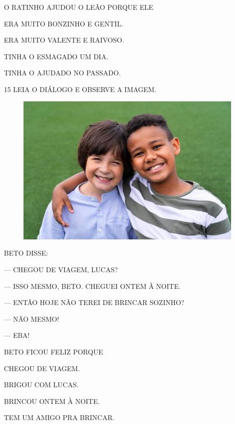 O RATINHO AJUDOU O LEÃO PORQUE ELE

\begin{escolha}
\item ERA MUITO BONZINHO E GENTIL.

\item ERA MUITO VALENTE E RAIVOSO.

\item TINHA O ESMAGADO UM DIA.

\item TINHA O AJUDADO NO PASSADO.
\end{escolha}

\pagebreak
\num{15} LEIA O DIÁLOGO E OBSERVE A IMAGEM.

\begin{figure}[H]
\centering
\includegraphics[width=\textwidth]{media/image220b.png}
\end{figure}

\begin{myquote}
BETO DISSE:

--- CHEGOU DE VIAGEM, LUCAS?

--- ISSO MESMO, BETO. CHEGUEI ONTEM À NOITE.

--- ENTÃO HOJE NÃO TEREI DE BRINCAR SOZINHO?

--- NÃO MESMO!

--- EBA!
\end{myquote}

BETO FICOU FELIZ PORQUE

\begin{escolha}
\item CHEGOU DE VIAGEM.

\item BRIGOU COM LUCAS.

\item BRINCOU ONTEM À NOITE.

\item TEM UM AMIGO PRA BRINCAR.
\end{escolha}



